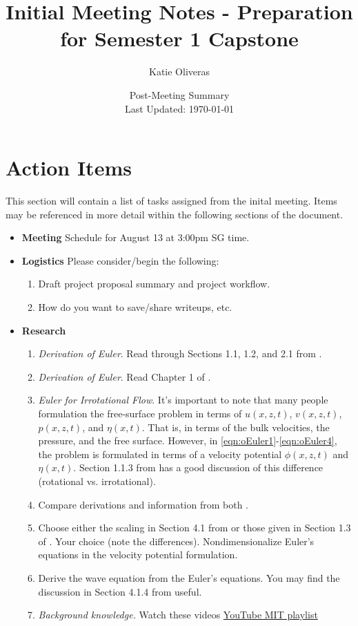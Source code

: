 \documentclass[a4paper,reqno]{article}
\title{Initial Meeting Notes - Preparation for Semester 1 Capstone}
\author{Katie Oliveras}
\date{Post-Meeting Summary\\Last Updated: \today}
\begin{document}
\maketitle
\section{Action Items}
    This section will contain a list of tasks assigned from the inital meeting.  Items may be referenced in more detail within the following sections of the document.  
    \begin{itemize}
        \item \textbf{Meeting} Schedule for August 13 at 3:00pm SG time.  
        \item \textbf{Logistics} Please consider/begin the following:
            \begin{enumerate}
                \item Draft project proposal summary and project workflow.  
                \item How do you want to save/share writeups, etc.
            \end{enumerate}
        \item \textbf{Research}
            \begin{enumerate}
                
                \item \emph{Derivation of Euler}. Read through Sections 1.1, 1.2, and 2.1 from \cite{chorin1990mathematical}.   
                \item \emph{Derivation of Euler}. Read Chapter 1 of \cite{johnson1997modern}.
                \item \emph{Euler for Irrotational Flow}.  It's important to note that many people formulation the free-surface problem in terms of $u(x,z,t)$, $v(x,z,t)$, $p(x,z,t)$, and $\eta(x,t)$.  That is, in terms of the bulk velocities, the pressure, and the free surface.  However, in \eqref{eqn:oEuler1}-\eqref{eqn:oEuler4}, the problem is formulated in terms of a velocity potential $\phi(x,z,t)$ and $\eta(x,t)$.  Section 1.1.3 from \cite{johnson1997modern} has a good discussion of this difference (rotational vs. irrotational).
                \item Compare derivations and information from both \cite{chorin1990mathematical,johnson1997modern}.
                \item Choose either the scaling in Section 4.1 from \cite{deconinckNotes} or those given in Section 1.3 of \cite{johnson1997modern}.  Your choice (note the differences).  Nondimensionalize Euler's equations in the velocity potential formulation.
                \item Derive the wave equation from the Euler's equations.  You may find the discussion in Section 4.1.4 from \cite{deconinckNotes} useful.
                \item \emph{Background knowledge.} Watch these videos \href{https://www.youtube.com/playlist?list=PLfF--3o8i4r82vJ0kjCVYgqKgyVM5QwN0}{YouTube MIT playlist}
            \end{enumerate}
    \end{itemize}
\end{document}
